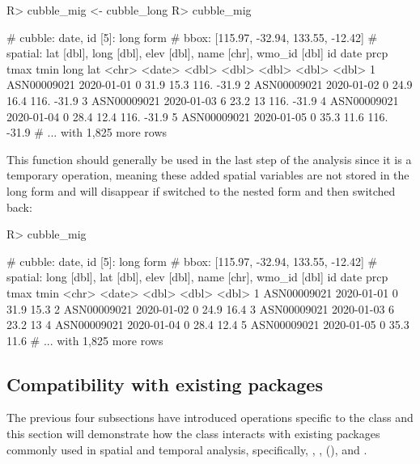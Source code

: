 \documentclass[
]{jss}
\begin{document}
\begin{CodeChunk}
\begin{CodeInput}
R> cubble_mig <- cubble_long %
R> cubble_mig
\end{CodeInput}
\begin{CodeOutput}
# cubble:  date, id [5]: long form
# bbox:    [115.97, -32.94, 133.55, -12.42]
# spatial: lat [dbl], long [dbl], elev [dbl], name [chr], wmo_id [dbl]
  id          date        prcp  tmax  tmin  long   lat
  <chr>       <date>     <dbl> <dbl> <dbl> <dbl> <dbl>
1 ASN00009021 2020-01-01     0  31.9  15.3  116. -31.9
2 ASN00009021 2020-01-02     0  24.9  16.4  116. -31.9
3 ASN00009021 2020-01-03     6  23.2  13    116. -31.9
4 ASN00009021 2020-01-04     0  28.4  12.4  116. -31.9
5 ASN00009021 2020-01-05     0  35.3  11.6  116. -31.9
# ... with 1,825 more rows
\end{CodeOutput}
\end{CodeChunk}

This function should generally be used in the last step of the analysis
since it is a temporary operation, meaning these added spatial variables
are not stored in the long form and will disappear if switched to the
nested form and then switched back:

\begin{CodeChunk}
\begin{CodeInput}
R> cubble_mig %
\end{CodeInput}
\begin{CodeOutput}
# cubble:  date, id [5]: long form
# bbox:    [115.97, -32.94, 133.55, -12.42]
# spatial: long [dbl], lat [dbl], elev [dbl], name [chr], wmo_id [dbl]
  id          date        prcp  tmax  tmin
  <chr>       <date>     <dbl> <dbl> <dbl>
1 ASN00009021 2020-01-01     0  31.9  15.3
2 ASN00009021 2020-01-02     0  24.9  16.4
3 ASN00009021 2020-01-03     6  23.2  13  
4 ASN00009021 2020-01-04     0  28.4  12.4
5 ASN00009021 2020-01-05     0  35.3  11.6
# ... with 1,825 more rows
\end{CodeOutput}
\end{CodeChunk}

\hypertarget{compatibility-with-existing-packages}{%
\subsection{Compatibility with existing
packages}\label{compatibility-with-existing-packages}}

The previous four subsections have introduced operations specific to the
 class and this section will demonstrate how the
 class interacts with existing packages commonly used in
spatial and temporal analysis, specifically, ,
,  (), and .
\end{document}
